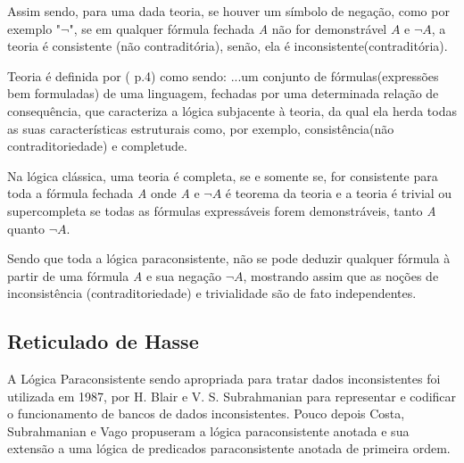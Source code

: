 Assim sendo, para uma dada teoria, 
se houver um símbolo de negação, 
como por exemplo "\emph{$\neg $}", 
se em qualquer fórmula fechada \emph{A} não for demonstrável \emph{$A$} e \emph{$\neg A $}, 
a teoria é consistente (não contraditória), 
senão, ela é inconsistente(contraditória).


Teoria é definida por \citeauthor{Gomes2013}(\citeyear{Gomes2013} p.4) como sendo:
\citacao
{
...um conjunto de fórmulas(expressões bem formuladas) de uma linguagem, 
fechadas por uma determinada relação de consequência, 
que caracteriza a lógica subjacente à teoria, 
da qual ela herda todas as suas características estruturais como, 
por exemplo, consistência(não contraditoriedade) e completude.
}

Na lógica clássica, 
uma teoria é completa, 
se e somente se, for consistente para toda a fórmula fechada \emph{A} 
onde \emph{A} e \emph{$\neg A$} é teorema da teoria 
e a teoria é trivial ou supercompleta se todas as fórmulas expressáveis forem demonstráveis, 
tanto \emph{A} quanto \emph{$ \neg A$}.


Sendo que toda a lógica paraconsistente, 
não se pode deduzir qualquer fórmula à partir de uma fórmula \emph{A} e sua negação \emph{$\neg A$}, 
mostrando assim que as noções de inconsistência (contraditoriedade) e trivialidade são de fato independentes.







\subsection{Reticulado de Hasse}

A Lógica Paraconsistente sendo apropriada para tratar dados inconsistentes foi utilizada em 1987, 
por H. Blair e V. S. Subrahmanian para representar e codificar o funcionamento de bancos de dados inconsistentes. 
Pouco depois Costa, Subrahmanian e Vago propuseram a lógica paraconsistente anotada e sua extensão a uma lógica de predicados paraconsistente anotada de primeira ordem. 

